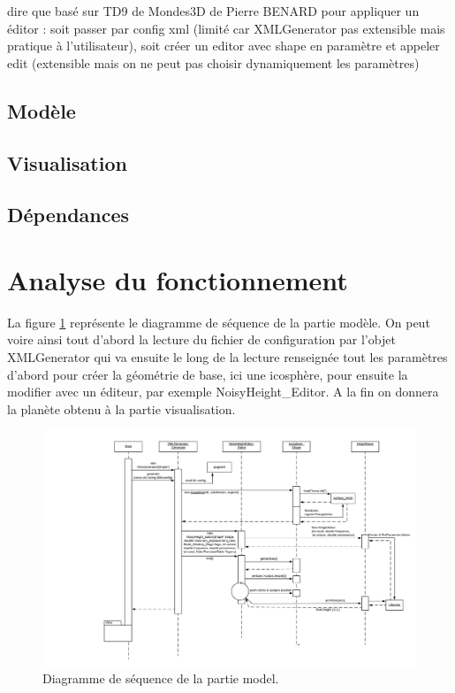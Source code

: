 \documentclass[a4paper]{article}
\begin{document}
dire que basé sur TD9 de Mondes3D de Pierre BENARD
pour appliquer un éditor : soit passer par config xml (limité car XMLGenerator pas extensible mais pratique à l'utilisateur), soit créer un editor avec shape en paramètre et appeler edit (extensible mais on ne peut pas choisir dynamiquement les paramètres)

\subsection{Modèle}

\subsection{Visualisation}

\subsection{Dépendances}

\newpage 
\section{Analyse du fonctionnement}

La figure \ref{seqmodel} représente le diagramme de séquence de la partie modèle. On peut voire ainsi tout d'abord la lecture du fichier de configuration par l'objet XMLGenerator qui va ensuite le long de la lecture renseignée tout les paramètres d'abord pour créer la géométrie de base, ici une icosphère, pour ensuite la modifier avec un éditeur, par exemple NoisyHeight\_Editor. A la fin on donnera la planète obtenu à la partie visualisation.\\

\begin{figure}[!h]
    \begin{center}
        \includegraphics[width=\linewidth]{img/seqmodel.png} 
        \caption{Diagramme de séquence de la partie model.}
        \label{seqmodel}
    \end{center}
\end{figure}
\end{document}
